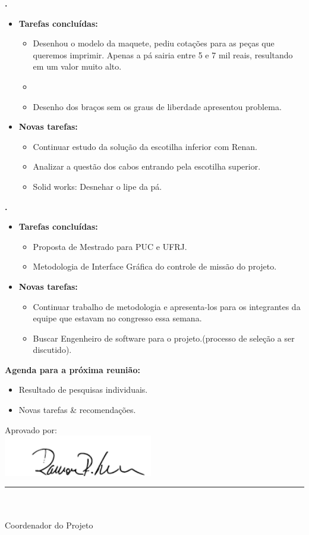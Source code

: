 			
   \textbf{.} 
	\begin{itemize}
		\item \textbf{Tarefas concluídas:}
			\begin{itemize}    
				\item Desenhou o modelo da maquete, pediu cotações para as peças que
				queremos imprimir. Apenas a pá sairia entre 5 e 7 mil reais, resultando em
				um valor muito alto. 
				\item 
				\item Desenho dos braços sem os graus de liberdade apresentou problema.
			\end{itemize}
		
		\item \textbf{Novas tarefas:}
			\begin{itemize} 
			    \item Continuar estudo da solução da escotilha inferior com Renan.
			    \item Analizar a questão dos cabos entrando pela escotilha superior.
			    \item Solid works: Desnehar o lipe da pá.
			\end{itemize}
	\end{itemize}

			
   \textbf{\Julia.} 
	\begin{itemize}
		\item \textbf{Tarefas concluídas:}
			\begin{itemize}    
				\item Proposta de Mestrado para PUC e UFRJ.
				\item Metodologia de Interface Gráfica do controle de missão do projeto.
			\end{itemize}
		
		\item \textbf{Novas tarefas:}
			\begin{itemize} 
			    \item Continuar trabalho de metodologia e apresenta-los para os
			    integrantes da equipe que estavam no congresso essa semana.
			    \item Buscar Engenheiro de software para o projeto.(processo de
			    seleção a ser discutido).
			\end{itemize}
	\end{itemize}		



\textbf{Agenda para a próxima reunião:}
  \begin{itemize}
    \item Resultado de pesquisas individuais.
    \item Novas tarefas \& recomendações.
  \end{itemize}


\vspace{5mm}%
\parbox[t]{70mm}{
  Aprovado por: \\[5mm]
  \centering
  \includegraphics[width=65mm]{figs/logo/assinatura-ramon.png} \\[-4mm]
  \rule[2mm]{70mm}{0.1mm} \\
  \ramon \\[1mm]
  Coordenador do Projeto \\
}

\fim